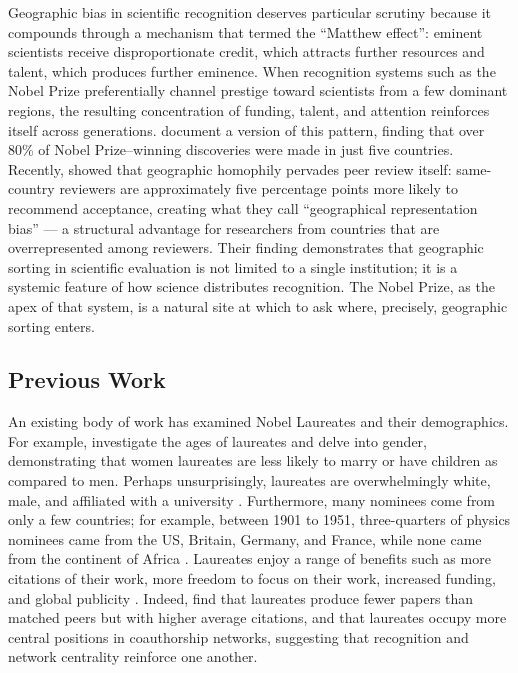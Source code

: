 \documentclass[11pt]{article}
\begin{document}
Geographic bias in scientific recognition deserves particular scrutiny because it compounds through a mechanism that \citet{Mer1968} termed the ``Matthew effect'': eminent scientists receive disproportionate credit, which attracts further resources and talent, which produces further eminence. When recognition systems such as the Nobel Prize preferentially channel prestige toward scientists from a few dominant regions, the resulting concentration of funding, talent, and attention reinforces itself across generations. \citet{vonZed2025} document a version of this pattern, finding that over 80\% of Nobel Prize--winning discoveries were made in just five countries. Recently, \citet{DumTep2025} showed that geographic homophily pervades peer review itself: same-country reviewers are approximately five percentage points more likely to recommend acceptance, creating what they call ``geographical representation bias'' --- a structural advantage for researchers from countries that are overrepresented among reviewers. Their finding demonstrates that geographic sorting in scientific evaluation is not limited to a single institution; it is a systemic feature of how science distributes recognition. The Nobel Prize, as the apex of that system, is a natural site at which to ask where, precisely, geographic sorting enters.

\subsection{Previous Work}

An existing body of work has examined Nobel Laureates and their demographics. For example, \citet{BafVam2011} investigate the ages of laureates and \citet{ChaEllRah2011} delve into gender, demonstrating that women laureates are less likely to marry or have children as compared to men. Perhaps unsurprisingly, laureates are overwhelmingly white, male, and affiliated with a university \citep{Cra2001}. Furthermore, many nominees come from only a few countries; for example, between 1901 to 1951, three-quarters of physics nominees came from the US, Britain, Germany, and France, while none came from the continent of Africa \citep{Cra2001}. Laureates enjoy a range of benefits such as more citations of their work, more freedom to focus on their work, increased funding, and global publicity \citep{CasFan2013}. Indeed, \citet{WagHorWhe2015} find that laureates produce fewer papers than matched peers but with higher average citations, and that laureates occupy more central positions in coauthorship networks, suggesting that recognition and network centrality reinforce one another.
\end{document}
